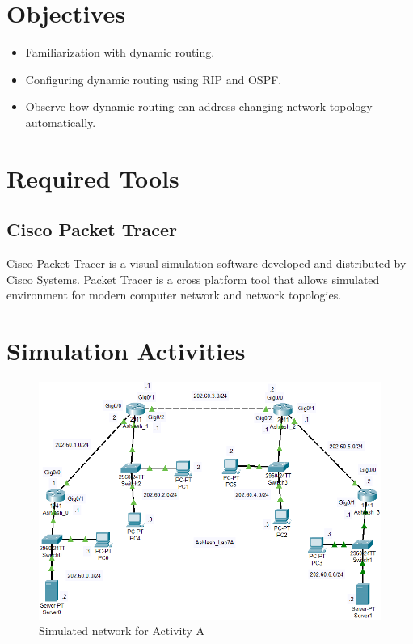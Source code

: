\documentclass{lab_sheet}
\begin{document}
\tableofcontents
\pagebreak
\listoffigures
\pagebreak
\listoftables
\pagebreak
\lstlistoflistings
\pagebreak
{}
\section{Objectives}
\begin{itemize}
	\item Familiarization with dynamic routing.
	\item Configuring dynamic routing using RIP and OSPF.
	\item Observe how dynamic routing can address changing network topology automatically.
\end{itemize}
\section{Required Tools}
\subsection{Cisco Packet Tracer}
Cisco Packet Tracer is a visual simulation software developed and distributed by Cisco Systems. Packet Tracer is a cross platform tool that allows simulated environment for modern computer network and network topologies.
\section{Simulation Activities}
\begin{figure}[H]
	\centering
	\includegraphics[scale=.8]{Figures/activitya.png}
	\caption{Simulated network for Activity A}
	\label{fig:activitya}
\end{figure}
\end{document}
